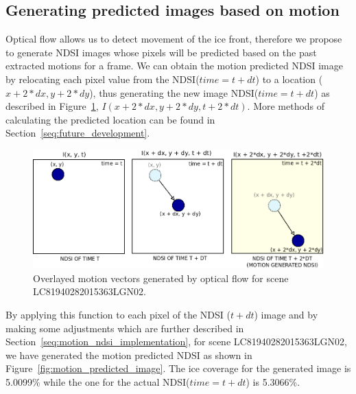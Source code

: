 \documentclass[12pt, a4paper]{report}
\begin{document}
	\subsection{Generating predicted images based on motion}
	\label{seq:motion_ndsi_functional}
	
	\par Optical flow allows us to detect movement of the ice front, therefore we propose to generate NDSI images whose pixels will be predicted based on the past extracted motions for a frame. We can obtain the motion predicted NDSI image by relocating each pixel value from
	the NDSI(\(time=t+dt\)) to a location (\(x + 2*dx, y + 2*dy\)), thus generating the new image NDSI(\(time=t+dt\)) as described in Figure~\ref{fig:motion_generated_schema}, \(I(x + 2*dx, y + 2*dy, t + 2*dt)\). More methods of calculating the predicted location can be found in Section~\ref{seq:future_development}.
	
	\begin{figure}[h]
		\centering
		\includegraphics[scale = 0.5]{../images/motion_generated_schema.png}
		\caption{Overlayed motion vectors generated by optical flow for scene LC81940282015363LGN02.}
		\label{fig:motion_generated_schema}
	\end{figure}

	\par By applying this function to each pixel of the NDSI (\(t + dt\)) image and by making some adjustments which are further described in Section~\ref{seq:motion_ndsi_implementation}, for scene LC81940282015363LGN02, we have generated the motion predicted NDSI as shown in Figure~\ref{fig:motion_predicted_image}. The ice coverage for the generated image is 5.0099\% while the one for the actual NDSI(\(time=t+dt\)) is 5.3066\%.
	
\end{document}
